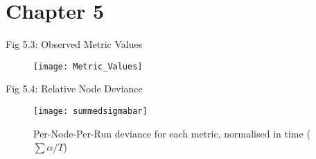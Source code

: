 \documentclass[aspectratio=43]{beamer}
\begin{document}
\section{Chapter 5}

\begin{frame}{Fig 5.3: Observed Metric Values}
	\begin{figure}
		\centering
		\texttt{[image: Metric\_Values]}
		\label{fig:metric_values}
	\end{figure}
\end{frame}
\begin{frame}{Fig 5.4: Relative Node Deviance}
	\begin{figure}
		\centering
		\texttt{[image: summedsigmabar]}
		\caption{Per-Node-Per-Run deviance for each metric, normalised in time ($\sum\alpha/T$)}
		\label{fig:summedsigmabar}
	\end{figure}
\end{frame}
\end{document}
